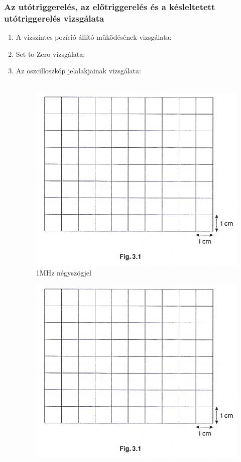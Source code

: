 \documentclass[10pt,a4paper]{article}
\begin{document}
		\subsubsection{Az utótriggerelés, az előtriggerelés és a késleltetett utótriggerelés vizsgálata}
			\begin{enumerate}
				\item A vízszintes pozíció állító működésének vizsgálata:\\
				$$$$ $$$$ $$$$ $$$$
				\item Set to Zero vizsgálata: $$$$ $$$$ $$$$ $$$$
				\newpage
				\item Az oszcilloszkóp jelalakjainak vizsgálata:
				\\\\
				\begin{figure}[hbtp]
				\centering
				\includegraphics[scale=0.5]{teljes/osc.jpg}
				\caption{1MHz négyszögjel}
				\end{figure}
				\begin{figure}[hbtp]
				\centering
				\includegraphics[scale=0.5]{teljes/osc.jpg}

\end{figure}
\end{enumerate}
\end{document}
